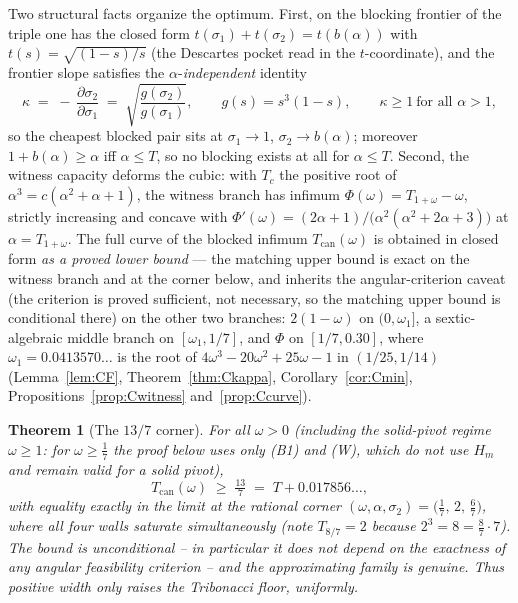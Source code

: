 \documentclass[11pt]{article}
\newtheorem{theorem}{Theorem}
\theoremstyle{definition}
\begin{document}
Two structural facts organize the optimum. First, on the blocking frontier of the
triple one has the closed form $t(\sigma_1)+t(\sigma_2)=t(b(\alpha))$ with
$t(s)=\sqrt{(1-s)/s}$ (the Descartes pocket read in the $t$-coordinate), and
the frontier slope satisfies the $\alpha$-\emph{independent} identity
\[
\kappa \;=\; -\,\frac{\partial\sigma_2}{\partial\sigma_1}
\;=\;\sqrt{\frac{g(\sigma_2)}{g(\sigma_1)}},\qquad g(s)=s^3(1-s),
\qquad \kappa\ge1\ \text{for all }\alpha>1 ,
\]
so the cheapest blocked pair sits at $\sigma_1\to1$, $\sigma_2\to b(\alpha)$;
moreover $1+b(\alpha)\ge\alpha$ iff $\alpha\le T$, so no blocking exists at
all for $\alpha\le T$. Second, the witness capacity deforms the cubic: with
$T_c$ the positive root of $\alpha^3=c(\alpha^2+\alpha+1)$, the
witness branch has infimum
$\Phi(\omega)=T_{1+\omega}-\omega$, strictly increasing and concave with
$\Phi'(\omega)=(2\alpha+1)/\bigl(\alpha^2(\alpha^2+2\alpha+3)\bigr)$ at
$\alpha=T_{1+\omega}$. The full curve of the blocked infimum
$T_{\mathrm{can}}(\omega)$ is obtained in closed form \emph{as a proved
lower bound} --- the
matching upper bound is exact on the witness branch and at the corner below,
and inherits the angular-criterion caveat (the criterion is proved
sufficient, not necessary, so the matching upper bound is conditional
there) on the other two branches:
$2(1-\omega)$ on $(0,\omega_1]$, a sextic-algebraic middle branch on
$[\omega_1,1/7]$, and $\Phi$ on $[1/7,0.30]$, where
$\omega_1=0.0413570\dots$ is the root of $4\omega^3-20\omega^2+25\omega-1$
in $(1/25,1/14)$
(Lemma~\ref{lem:CF}, Theorem~\ref{thm:Ckappa}, Corollary~\ref{cor:Cmin},
Propositions~\ref{prop:Cwitness} and~\ref{prop:Ccurve}).

\begin{theorem}[The $13/7$ corner]\label{thm:corner}
For all $\omega>0$ (including the solid-pivot regime $\omega\ge1$: for
$\omega\ge\tfrac17$ the proof below uses only (B1) and (W), which do
not use $H_m$ and remain valid for a solid pivot),
\[
T_{\mathrm{can}}(\omega)\;\ge\;\tfrac{13}{7}\;=\;T+0.017856\dots,
\]
with equality exactly in the limit at the rational corner
$(\omega,\alpha,\sigma_2)=\bigl(\tfrac17,\,2,\,\tfrac67\bigr)$, where all
four walls saturate simultaneously (note $T_{8/7}=2$ because $2^3=8=
\tfrac87\cdot7$). The bound is unconditional -- in particular it does not
depend on the exactness of any angular feasibility criterion -- and the
approximating family is genuine. Thus positive width only \emph{raises} the
Tribonacci floor, uniformly.
\end{theorem}
\end{document}
